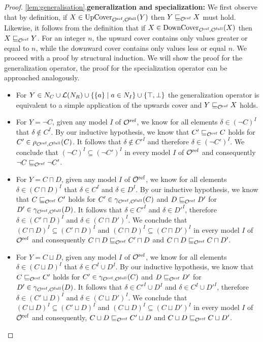 \begin{proof}
  \item \ref{lem:generalisation}.\enspace \textbf{generalization and specialization:\enspace}
  We first observe that by definition, if $X \in {\ensuremath{\operatorname{UpCover}}}_{{\mathcal{O}^\textnormal{ref}},{\mathcal{O}^\textnormal{full}}}(Y)$ then $Y \sqsubseteq_{\mathcal{O}^\textnormal{ref}} X$ must hold. Likewise, it follows from the definition that if $X \in {\ensuremath{\operatorname{DownCover}}}_{{\mathcal{O}^\textnormal{ref}},{\mathcal{O}^\textnormal{full}}}(X)$ then $X \sqsubseteq_{\mathcal{O}^\textnormal{ref}} Y$. For an integer $n$, the upward cover contains only values greater or equal to $n$, while the downward cover contains only values less or equal $n$. We proceed with a proof by structural induction. We will show the proof for the generalization operator, the proof for the specialization operator can be approached analogously.
  \begin{itemize}
    \item For $Y \in N_C \cup \mathcal{L}(N_R) \cup \{ \{a\} \mid a \in N_I \} \cup \{ \top, \bot \}$ the generalization operator is equivalent to a simple application of the upwards cover and $Y \sqsubseteq_{\mathcal{O}^\textnormal{ref}} X$ holds.
    \item For $Y = \lnot C$, given any model $I$ of ${\mathcal{O}^\textnormal{ref}}$, we know for all elements $\delta \in (\lnot C)^I$ that $\delta \not\in C^I$. By our inductive hypothesis, we know that $C' \sqsubseteq_{\mathcal{O}^\textnormal{ref}} C$ holds for $C' \in \rho_{{\mathcal{O}^\textnormal{ref}},{\mathcal{O}^\textnormal{full}}}(C)$. It follows that $\delta \not\in C'^I$ and therefore $\delta \in (\lnot C')^I$. We conclude that $(\lnot C)^I \subseteq (\lnot C')^I$ in every model $I$ of ${\mathcal{O}^\textnormal{ref}}$ and consequently $\lnot C \sqsubseteq_{\mathcal{O}^\textnormal{ref}} \lnot C'$.
    \item For $Y = C \sqcap D$, given any model $I$ of ${\mathcal{O}^\textnormal{ref}}$, we know for all elements $\delta \in (C \sqcap D)^I$ that $\delta \in C^I$ and $\delta \in D^I$. By our inductive hypothesis, we know that $C \sqsubseteq_{\mathcal{O}^\textnormal{ref}} C'$ holds for $C' \in \gamma_{{\mathcal{O}^\textnormal{ref}},{\mathcal{O}^\textnormal{full}}}(C)$ and $D \sqsubseteq_{\mathcal{O}^\textnormal{ref}} D'$ for $D' \in \gamma_{{\mathcal{O}^\textnormal{ref}},{\mathcal{O}^\textnormal{full}}}(D)$. It follows that $\delta \in C'^I$ and $\delta \in D'^I$, therefore $\delta \in (C' \sqcap D)^I$ and $\delta \in (C \sqcap D')^I$. We conclude that $(C \sqcap D)^I \subseteq (C' \sqcap D)^I$ and $(C \sqcap D)^I \subseteq (C \sqcap D')^I$ in every model $I$ of ${\mathcal{O}^\textnormal{ref}}$ and consequently $C \sqcap D \sqsubseteq_{\mathcal{O}^\textnormal{ref}} C' \sqcap D$ and $C \sqcap D \sqsubseteq_{\mathcal{O}^\textnormal{ref}} C \sqcap D'$.
    \item For $Y = C \sqcup D$, given any model $I$ of ${\mathcal{O}^\textnormal{ref}}$, we know for all elements $\delta \in (C \sqcup D)^I$ that $\delta \in C^I \cup D^I$. By our inductive hypothesis, we know that $C \sqsubseteq_{\mathcal{O}^\textnormal{ref}} C'$ holds for $C' \in \gamma_{{\mathcal{O}^\textnormal{ref}},{\mathcal{O}^\textnormal{full}}}(C)$ and $D \sqsubseteq_{\mathcal{O}^\textnormal{ref}} D'$ for $D' \in \gamma_{{\mathcal{O}^\textnormal{ref}},{\mathcal{O}^\textnormal{full}}}(D)$. It follows that $\delta \in C'^I \cup D^I$ and $\delta \in C^I \cup D'^I$, therefore $\delta \in (C' \sqcup D)^I$ and $\delta \in (C \sqcup D')^I$. We conclude that $(C \sqcup D)^I \subseteq (C' \sqcup D)^I$ and $(C \sqcup D)^I \subseteq (C \sqcup D')^I$ in every model $I$ of ${\mathcal{O}^\textnormal{ref}}$ and consequently, $C \sqcup D \sqsubseteq_{\mathcal{O}^\textnormal{ref}} C' \sqcup D$ and $C \sqcup D \sqsubseteq_{\mathcal{O}^\textnormal{ref}} C \sqcup D'$.

\end{itemize}
\end{proof}
